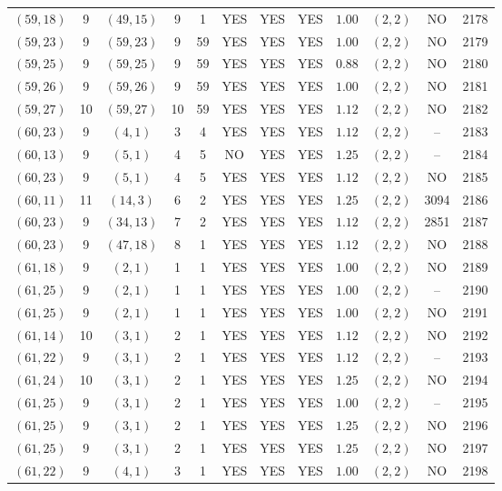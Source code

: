 \begin{longtable}{|c|c|c|c|c|c|c|c|c|c|c|c|}
$(59,18)$ & 9 & $(49,15)$ & 9 & 1 & YES & YES & YES & $1.00$ & $(2,2)$ & NO & 2178\\
$(59,23)$ & 9 & $(59,23)$ & 9 & 59 & YES & YES & YES & $1.00$ & $(2,2)$ & NO & 2179\\
$(59,25)$ & 9 & $(59,25)$ & 9 & 59 & YES & YES & YES & $0.88$ & $(2,2)$ & NO & 2180\\
$(59,26)$ & 9 & $(59,26)$ & 9 & 59 & YES & YES & YES & $1.00$ & $(2,2)$ & NO & 2181\\
$(59,27)$ & 10 & $(59,27)$ & 10 & 59 & YES & YES & YES & $1.12$ & $(2,2)$ & NO & 2182\\
$(60,23)$ & 9 & $(4,1)$ & 3 & 4 & YES & YES & YES & $1.12$ & $(2,2)$ & -- & 2183\\
$(60,13)$ & 9 & $(5,1)$ & 4 & 5 & NO & YES & YES & $1.25$ & $(2,2)$ & -- & 2184\\
$(60,23)$ & 9 & $(5,1)$ & 4 & 5 & YES & YES & YES & $1.12$ & $(2,2)$ & NO & 2185\\
$(60,11)$ & 11 & $(14,3)$ & 6 & 2 & YES & YES & YES & $1.25$ & $(2,2)$ & 3094 & 2186\\
$(60,23)$ & 9 & $(34,13)$ & 7 & 2 & YES & YES & YES & $1.12$ & $(2,2)$ & 2851 & 2187\\
$(60,23)$ & 9 & $(47,18)$ & 8 & 1 & YES & YES & YES & $1.12$ & $(2,2)$ & NO & 2188\\
$(61,18)$ & 9 & $(2,1)$ & 1 & 1 & YES & YES & YES & $1.00$ & $(2,2)$ & NO & 2189\\
$(61,25)$ & 9 & $(2,1)$ & 1 & 1 & YES & YES & YES & $1.00$ & $(2,2)$ & -- & 2190\\
$(61,25)$ & 9 & $(2,1)$ & 1 & 1 & YES & YES & YES & $1.00$ & $(2,2)$ & NO & 2191\\
$(61,14)$ & 10 & $(3,1)$ & 2 & 1 & YES & YES & YES & $1.12$ & $(2,2)$ & NO & 2192\\
$(61,22)$ & 9 & $(3,1)$ & 2 & 1 & YES & YES & YES & $1.12$ & $(2,2)$ & -- & 2193\\
$(61,24)$ & 10 & $(3,1)$ & 2 & 1 & YES & YES & YES & $1.25$ & $(2,2)$ & NO & 2194\\
$(61,25)$ & 9 & $(3,1)$ & 2 & 1 & YES & YES & YES & $1.00$ & $(2,2)$ & -- & 2195\\
$(61,25)$ & 9 & $(3,1)$ & 2 & 1 & YES & YES & YES & $1.25$ & $(2,2)$ & NO & 2196\\
$(61,25)$ & 9 & $(3,1)$ & 2 & 1 & YES & YES & YES & $1.25$ & $(2,2)$ & NO & 2197\\
$(61,22)$ & 9 & $(4,1)$ & 3 & 1 & YES & YES & YES & $1.00$ & $(2,2)$ & NO & 2198\\

\end{longtable}
